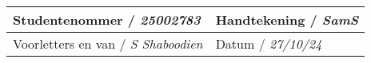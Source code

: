 \vfill

\noindent \begin{tabularx}{1.0\linewidth}{|L|L|}
    \hline
    \vspace{1cm} {Studentenommer / \textit{25002783}} & \vspace{1cm} {Handtekening / \textit{SamS}} \\
    \hline
    \vspace{1cm} {Voorletters en van / \textit{S Shaboodien}} & \vspace{1cm} {Datum / \textit{27/10/24}} \\
    \hline
\end{tabularx}

\vspace{15pt}


%
%
%
%
%

